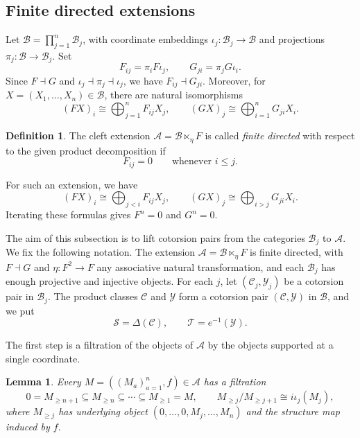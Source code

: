 \documentclass[11pt]{amsart}
\newtheorem{lemma}[theorem]{Lemma}
\theoremstyle{definition}
\newtheorem{definition}[theorem]{Definition}
\theoremstyle{remark}
\theoremstyle{plain}
\numberwithin{equation}{section}
\begin{document}
\subsection{Finite directed extensions}\label{subsec:directed}

Let $\mathcal{B}=\prod_{j=1}^n\mathcal{B}_j$, with coordinate embeddings $\iota_j:\mathcal{B}_j\to\mathcal{B}$ and projections
$\pi_j:\mathcal{B}\to\mathcal{B}_j$. Set
\[
F_{ij}=\pi_iF\iota_j,
\qquad
G_{ji}=\pi_jG\iota_i.
\]
Since $F\dashv G$ and $\iota_j\dashv\pi_j\dashv\iota_j$,
we have $F_{ij}\dashv G_{ji}$. Moreover, for
$X=(X_1,\ldots,X_n)\in\mathcal{B}$, there are natural isomorphisms
\[
(FX)_i\cong\bigoplus_{j=1}^nF_{ij}X_j,
\qquad
(GX)_j\cong\bigoplus_{i=1}^nG_{ji}X_i.
\]

\begin{definition}\label{def:directed}
	The cleft extension $\mathcal{A}=\mathcal{B}\ltimes_\eta F$
	is called \emph{finite directed} with respect to the given
	product decomposition if
	\begin{equation}\label{eq:directed}
		F_{ij}=0\qquad\text{whenever }i\leq j.
	\end{equation}
\end{definition}

For such an extension, we have
\[
(FX)_i\cong\bigoplus_{j<i}F_{ij}X_j,
\qquad
(GX)_j\cong\bigoplus_{i>j}G_{ji}X_i.
\]
Iterating these formulas gives $F^n=0$ and $G^n=0$.

The aim of this subsection is to lift cotorsion pairs from the categories
$\mathcal{B}_j$ to $\mathcal{A}$. We fix the following notation. The extension
$\mathcal{A}=\mathcal{B}\ltimes_\eta F$ is finite directed, with $F\dashv G$ and
$\eta:F^2\to F$ any associative natural transformation, and each
$\mathcal{B}_j$ has enough projective and injective objects. For each $j$, let
$(\mathcal{C}_j,\mathcal{Y}_j)$ be a cotorsion pair in $\mathcal{B}_j$. The product classes
$\mathcal{C}$ and $\mathcal{Y}$ form a cotorsion pair $(\mathcal{C},\mathcal{Y})$ in $\mathcal{B}$, and we
put
\[
\mathcal{S}=\Delta(\mathcal{C}),\qquad \mathcal{T}=e^{-1}(\mathcal{Y}).
\]

The first step is a filtration of the objects of $\mathcal{A}$ by the objects
supported at a single coordinate.

\begin{lemma}\label{lem:vertex-filtration}
	Every $M=((M_a)_{a=1}^n,f)\in\mathcal{A}$ has a filtration
	\begin{equation}\label{eq:vertex-filtration}
		0=M_{\geq n+1}\subseteq M_{\geq n}\subseteq\cdots\subseteq M_{\geq1}=M,
		\qquad M_{\geq j}/M_{\geq j+1}\cong i\iota_j(M_j),
	\end{equation}
	where $M_{\geq j}$ has underlying object $(0,\ldots,0,M_j,\ldots,M_n)$ and
	the structure map induced by $f$.
\end{lemma}
\end{document}
